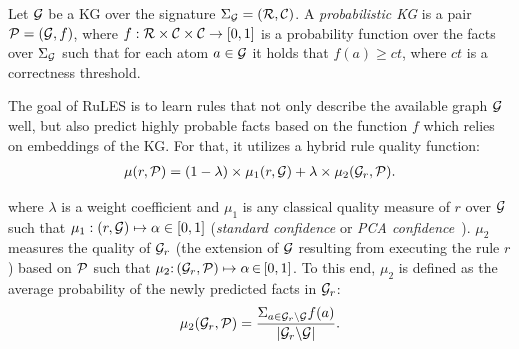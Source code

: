 Let  $\mathcal{G}$ be a KG over the signature $\Sigma_{\mathcal{G}}=(\mathcal{R},\mathcal{C})$.
A \emph{probabilistic KG} is a pair $\mathcal{P} = (\mathcal{G},f)$, 
where $f:\mathcal{R}\times \mathcal{C} \times \mathcal{C}\rightarrow [0,1]$ is a probability function over the facts over $\Sigma_{\mathcal{G}}$ such that for each atom $a \in \mathcal{G} $ it holds that $f(a) \geq ct $, where $ct$ is a correctness threshold.

The goal of RuLES is to learn rules that not only describe the available graph $\mathcal{G}$ well, but also predict highly probable facts based on the function $f$ which relies on embeddings of the KG. For that, it utilizes a hybrid rule quality function:
\begin{align*}
	\mu(r,\mathcal{P})= (1 - \lambda)\times \mu_1(r,\mathcal{G}) + \lambda \times \mu_2(\mathcal{G}_r,\mathcal{P}).
\end{align*}

\noindent where $\lambda$ is a weight coefficient and $\mu_1$ is any classical quality measure of $r$ over $\mathcal{G}$ such that $\mu_1: (r,\mathcal{G}) \mapsto \alpha \in  [0,1]$ (\eg \textit{standard confidence} or \textit{PCA confidence}~\cite{amie}). 
$\mu_2$ measures the quality of $\mathcal{G}_r$ (\ie the extension of $\mathcal{G}$ resulting from executing the rule $r$) based on $\mathcal{P}$ such that
 $\mu_2{:}\, (\mathcal{G}_r,\mathcal{P}) \mapsto  \alpha \,{\in}\, [0,1]$. To this end, $\mu_2$ is defined as the average probability of the newly predicted facts in $\mathcal{G}_r$: %
\begin{align*}
	\mu_2(\mathcal{G}_r,\mathcal{P}) = \dfrac{\Sigma_{a\in \mathcal{G}_r\backslash \mathcal{G}} f(a)}{|\mathcal{G}_r \backslash \mathcal{G}|}.
\end{align*}



